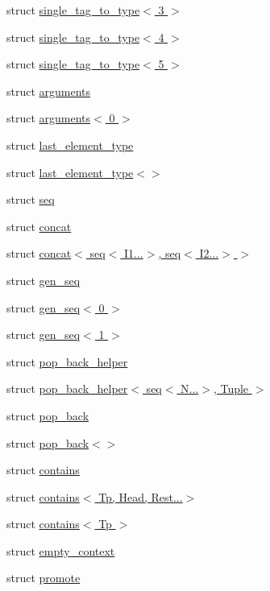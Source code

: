 \begin{DoxyCompactItemize}
struct \hyperlink{structcrow_1_1black__magic_1_1single__tag__to__type_3_013_01_4}{single\-\_\-tag\-\_\-to\-\_\-type$<$ 3 $>$}
\item 
struct \hyperlink{structcrow_1_1black__magic_1_1single__tag__to__type_3_014_01_4}{single\-\_\-tag\-\_\-to\-\_\-type$<$ 4 $>$}
\item 
struct \hyperlink{structcrow_1_1black__magic_1_1single__tag__to__type_3_015_01_4}{single\-\_\-tag\-\_\-to\-\_\-type$<$ 5 $>$}
\item 
struct \hyperlink{structcrow_1_1black__magic_1_1arguments}{arguments}
\item 
struct \hyperlink{structcrow_1_1black__magic_1_1arguments_3_010_01_4}{arguments$<$ 0 $>$}
\item 
struct \hyperlink{structcrow_1_1black__magic_1_1last__element__type}{last\-\_\-element\-\_\-type}
\item 
struct \hyperlink{structcrow_1_1black__magic_1_1last__element__type_3_4}{last\-\_\-element\-\_\-type$<$$>$}
\item 
struct \hyperlink{structcrow_1_1black__magic_1_1seq}{seq}
\item 
struct \hyperlink{structcrow_1_1black__magic_1_1concat}{concat}
\item 
struct \hyperlink{structcrow_1_1black__magic_1_1concat_3_01seq_3_01_i1_8_8_8_4_00_01seq_3_01_i2_8_8_8_4_01_4}{concat$<$ seq$<$ I1...$>$, seq$<$ I2...$>$ $>$}
\item 
struct \hyperlink{structcrow_1_1black__magic_1_1gen__seq}{gen\-\_\-seq}
\item 
struct \hyperlink{structcrow_1_1black__magic_1_1gen__seq_3_010_01_4}{gen\-\_\-seq$<$ 0 $>$}
\item 
struct \hyperlink{structcrow_1_1black__magic_1_1gen__seq_3_011_01_4}{gen\-\_\-seq$<$ 1 $>$}
\item 
struct \hyperlink{structcrow_1_1black__magic_1_1pop__back__helper}{pop\-\_\-back\-\_\-helper}
\item 
struct \hyperlink{structcrow_1_1black__magic_1_1pop__back__helper_3_01seq_3_01_n_8_8_8_4_00_01_tuple_01_4}{pop\-\_\-back\-\_\-helper$<$ seq$<$ N...$>$, Tuple $>$}
\item 
struct \hyperlink{structcrow_1_1black__magic_1_1pop__back}{pop\-\_\-back}
\item 
struct \hyperlink{structcrow_1_1black__magic_1_1pop__back_3_4}{pop\-\_\-back$<$$>$}
\item 
struct \hyperlink{structcrow_1_1black__magic_1_1contains}{contains}
\item 
struct \hyperlink{structcrow_1_1black__magic_1_1contains_3_01_tp_00_01_head_00_01_rest_8_8_8_4}{contains$<$ Tp, Head, Rest...$>$}
\item 
struct \hyperlink{structcrow_1_1black__magic_1_1contains_3_01_tp_01_4}{contains$<$ Tp $>$}
\item 
struct \hyperlink{structcrow_1_1black__magic_1_1empty__context}{empty\-\_\-context}
\item 
struct \hyperlink{structcrow_1_1black__magic_1_1promote}{promote}
\end{DoxyCompactItemize}
